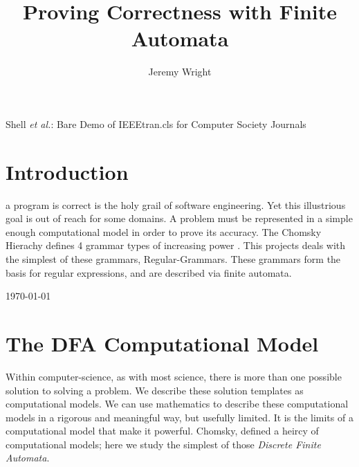 \documentclass[12pt,journal,compsoc]{IEEEtran}
\begin{document}
\title{Proving Correctness with Finite Automata}
\author{Jeremy Wright}
{Shell \MakeLowercase{\textit{et al.}}: Bare Demo of IEEEtran.cls for Computer Society Journals}

\maketitle


\IEEEdisplaynotcompsoctitleabstractindextext

\IEEEpeerreviewmaketitle

\section{Introduction}
 a program is correct is the holy grail of software
engineering. Yet this illustrious goal is out of reach for some domains.
A problem must be represented in a simple enough computational model in order to
prove its accuracy. The Chomsky Hierachy defines 4 grammar types of increasing
power \cite{wiki-chomsky}. This projects deals with the simplest of these
grammars, Regular-Grammars.  These grammars form the basis for regular
expressions, and are described via finite automata. 

\hfill \today

\section{The DFA Computational Model}
Within computer-science, as with most science, there is more than one possible
solution to solving a problem. We describe these solution templates as
computational models.  We can use mathematics to describe these computational
models in a rigorous and meaningful way, but usefully limited. It is the limits
of a computational model that make it powerful. Chomsky, defined a heircy of
computational models; here we study the simplest of those \emph{Discrete Finite
Automata}.  
\end{document}

